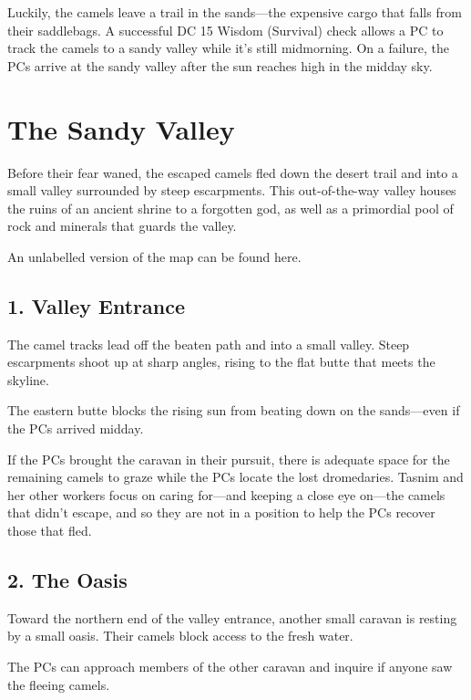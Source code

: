 \documentclass[10pt,a4paper,twoside,bg=print,twocolumn,openany,nodeprecatedcode]{dndbook}
\begin{document}
Luckily, the camels leave a trail in the sands—the expensive cargo that falls from their saddlebags. A successful DC 15 Wisdom (Survival) check allows a PC to track the camels to a sandy valley while it's still midmorning. On a failure, the PCs arrive at the sandy valley after the sun reaches high in the midday sky.

\section{The Sandy Valley}
Before their fear waned, the escaped camels fled down the desert trail and into a small valley surrounded by steep escarpments. This out-of-the-way valley houses the ruins of an ancient shrine to a forgotten god, as well as a primordial pool of rock and minerals that guards the valley.

An unlabelled version of the map can be found here.

\subsection{1. Valley Entrance}
\begin{DndReadAloud}{}
The camel tracks lead off the beaten path and into a small valley. Steep escarpments shoot up at sharp angles, rising to the flat butte that meets the skyline.

\end{DndReadAloud}

The eastern butte blocks the rising sun from beating down on the sands—even if the PCs arrived midday.

If the PCs brought the caravan in their pursuit, there is adequate space for the remaining camels to graze while the PCs locate the lost dromedaries. Tasnim and her other workers focus on caring for—and keeping a close eye on—the camels that didn't escape, and so they are not in a position to help the PCs recover those that fled.

\subsection{2. The Oasis}
\begin{DndReadAloud}{}
Toward the northern end of the valley entrance, another small caravan is resting by a small oasis. Their camels block access to the fresh water.

\end{DndReadAloud}

The PCs can approach members of the other caravan and inquire if anyone saw the fleeing camels.
\end{document}
